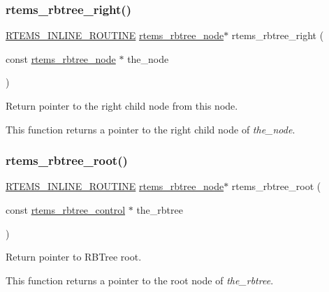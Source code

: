 \subsubsection{\texorpdfstring{rtems\_rbtree\_right()}{rtems\_rbtree\_right()}}
{\footnotesize\ttfamily \mbox{\hyperlink{group__RTEMSScoreBaseDefs_gac216239df231d5dbd15e3520b0b9313f}{R\+T\+E\+M\+S\+\_\+\+I\+N\+L\+I\+N\+E\+\_\+\+R\+O\+U\+T\+I\+NE}} \mbox{\hyperlink{group__ClassicRBTrees_gaef47fc7fc61856c9afbf7f18a26ff80d}{rtems\+\_\+rbtree\+\_\+node}}$\ast$ rtems\+\_\+rbtree\+\_\+right (\begin{DoxyParamCaption}\item[{const \mbox{\hyperlink{group__ClassicRBTrees_gaef47fc7fc61856c9afbf7f18a26ff80d}{rtems\+\_\+rbtree\+\_\+node}} $\ast$}]{the\+\_\+node }\end{DoxyParamCaption})}



Return pointer to the right child node from this node. 

This function returns a pointer to the right child node of {\itshape the\+\_\+node}. \mbox{\label{group__ClassicRBTrees_ga1403efdb42c97e073824a6350f09ea6f}} 
\subsubsection{\texorpdfstring{rtems\_rbtree\_root()}{rtems\_rbtree\_root()}}
{\footnotesize\ttfamily \mbox{\hyperlink{group__RTEMSScoreBaseDefs_gac216239df231d5dbd15e3520b0b9313f}{R\+T\+E\+M\+S\+\_\+\+I\+N\+L\+I\+N\+E\+\_\+\+R\+O\+U\+T\+I\+NE}} \mbox{\hyperlink{group__ClassicRBTrees_gaef47fc7fc61856c9afbf7f18a26ff80d}{rtems\+\_\+rbtree\+\_\+node}}$\ast$ rtems\+\_\+rbtree\+\_\+root (\begin{DoxyParamCaption}\item[{const \mbox{\hyperlink{group__ClassicRBTrees_ga21fe446d0b3cb8b25c814e93357753ef}{rtems\+\_\+rbtree\+\_\+control}} $\ast$}]{the\+\_\+rbtree }\end{DoxyParamCaption})}



Return pointer to R\+B\+Tree root. 

This function returns a pointer to the root node of {\itshape the\+\_\+rbtree}. \mbox{\label{group__ClassicRBTrees_gaeeee1471df6437621cee7d5f80c37f2d}} 
